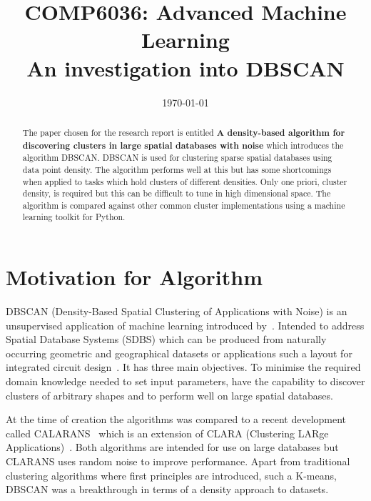 \documentclass{ecsarticle}     %
\begin{document}
\frontmatter
\title      {COMP6036: Advanced Machine Learning\\
            An investigation into DBSCAN}
      
\addresses  {\deptname\\\univname}

\date       {\today}
\subject    {}
\keywords   {}
\maketitle


\begin{abstract}
The paper chosen for the research report is entitled \textbf{A density-based algorithm for discovering clusters in large spatial databases with noise} which introduces the algorithm DBSCAN.
DBSCAN is used for clustering sparse spatial databases using data point density.
The algorithm performs well at this but has some shortcomings when applied to tasks which hold clusters of different densities.
Only one priori, cluster density, is required but this can be difficult to tune in high dimensional space.
The algorithm is compared against other common cluster implementations using a machine learning toolkit for Python.
\end{abstract}

\mainmatter


\section{Motivation for Algorithm}

DBSCAN (Density-Based Spatial Clustering of Applications with Noise) is an unsupervised application of machine learning introduced by~\cite{ester96dbscan}.
Intended to address Spatial Database Systems (SDBS) which can be produced from naturally occurring geometric and geographical datasets or applications such a layout for integrated circuit design~\citep{guting94sdbs}.
It has three main objectives.
To minimise the required domain knowledge needed to set input parameters, have the capability to discover clusters of arbitrary shapes and to perform well on large spatial databases.

At the time of creation the algorithms was compared to a recent development called CALARANS~\citep{ng94clarans} which is an extension of CLARA (Clustering LARge Applications)~\citep{kaufman90clara}.
Both algorithms are intended for use on large databases but CLARANS uses random noise to improve performance.
Apart from traditional clustering algorithms where first principles are introduced, such a K-means, DBSCAN was a breakthrough in terms of a density approach to datasets.
\end{document}

